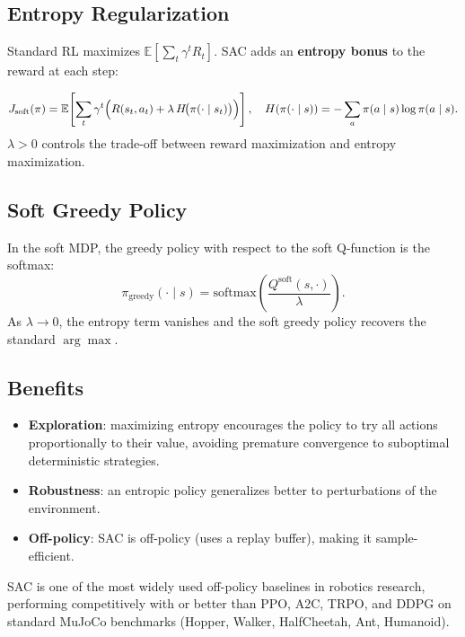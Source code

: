\documentclass[11pt,a4paper]{article}
\theoremstyle{definition}
\theoremstyle{plain}
\theoremstyle{remark}
\begin{document}
\subsection{Entropy Regularization}

Standard RL maximizes $\mathbb{E}[\sum_t \gamma^t R_t]$. SAC adds an \textbf{entropy bonus} to the reward at each step:

\begin{tcolorbox}[colback=blue!5!white,colframe=blue!75!black,title=\textbf{Soft MDP Objective}]
\[
    J_{\mathrm{soft}}(\pi) = \mathbb{E}\!\left[\sum_t \gamma^t \Bigl(R(s_t, a_t) + \lambda\, H\!\bigl(\pi(\cdot \mid s_t)\bigr)\Bigr)\right],
    \quad H(\pi(\cdot \mid s)) = -\sum_a \pi(a \mid s)\log \pi(a \mid s).
\]
$\lambda > 0$ controls the trade-off between reward maximization and entropy maximization.
\end{tcolorbox}

\subsection{Soft Greedy Policy}

In the soft MDP, the greedy policy with respect to the soft Q-function is the softmax:
\[
    \pi_{\mathrm{greedy}}(\cdot \mid s) = \mathrm{softmax}\!\left(\frac{Q^{\mathrm{soft}}(s, \cdot)}{\lambda}\right).
\]
As $\lambda \to 0$, the entropy term vanishes and the soft greedy policy recovers the standard $\arg\max$.

\subsection{Benefits}

\begin{itemize}
    \item \textbf{Exploration}: maximizing entropy encourages the policy to try all actions proportionally to their value, avoiding premature convergence to suboptimal deterministic strategies.
    \item \textbf{Robustness}: an entropic policy generalizes better to perturbations of the environment.
    \item \textbf{Off-policy}: SAC is off-policy (uses a replay buffer), making it sample-efficient.
\end{itemize}

SAC is one of the most widely used off-policy baselines in robotics research, performing competitively with or better than PPO, A2C, TRPO, and DDPG on standard MuJoCo benchmarks (Hopper, Walker, HalfCheetah, Ant, Humanoid).
\end{document}
